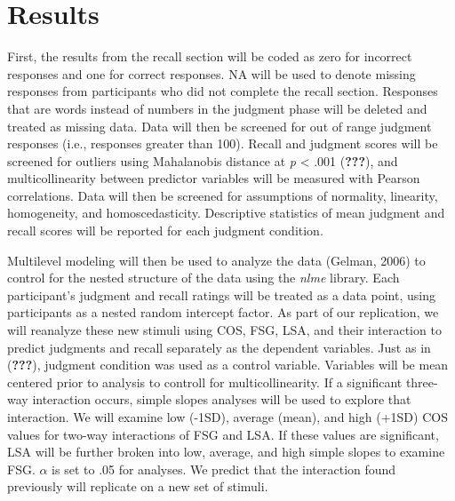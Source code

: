 \documentclass[english,man]{apa6}
\theoremstyle{definition}
\theoremstyle{definition}
\theoremstyle{definition}
\theoremstyle{remark}
\begin{document}
\section{Results}\label{results}

First, the results from the recall section will be coded as zero for
incorrect responses and one for correct responses. NA will be used to
denote missing responses from participants who did not complete the
recall section. Responses that are words instead of numbers in the
judgment phase will be deleted and treated as missing data. Data will
then be screened for out of range judgment responses (i.e., responses
greater than 100). Recall and judgment scores will be screened for
outliers using Mahalanobis distance at \emph{p} \textless{} .001
({\textbf{???}}), and multicollinearity between predictor variables will
be measured with Pearson correlations. Data will then be screened for
assumptions of normality, linearity, homogeneity, and homoscedasticity.
Descriptive statistics of mean judgment and recall scores will be
reported for each judgment condition.

Multilevel modeling will then be used to analyze the data (Gelman, 2006)
to control for the nested structure of the data using the \emph{nlme}
library. Each participant's judgment and recall ratings will be treated
as a data point, using participants as a nested random intercept factor.
As part of our replication, we will reanalyze these new stimuli using
COS, FSG, LSA, and their interaction to predict judgments and recall
separately as the dependent variables. Just as in ({\textbf{???}}),
judgment condition was used as a control variable. Variables will be
mean centered prior to analysis to controll for multicollinearity. If a
significant three-way interaction occurs, simple slopes analyses will be
used to explore that interaction. We will examine low (-1SD), average
(mean), and high (+1SD) COS values for two-way interactions of FSG and
LSA. If these values are significant, LSA will be further broken into
low, average, and high simple slopes to examine FSG. \(\alpha\) is set
to .05 for analyses. We predict that the interaction found previously
will replicate on a new set of stimuli.
\end{document}
